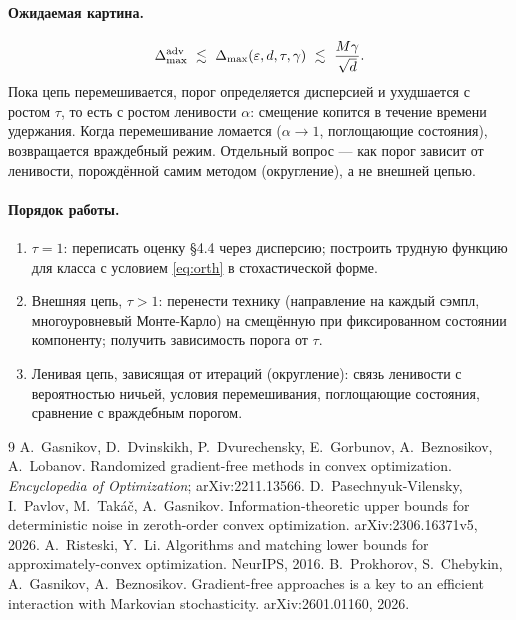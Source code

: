 \documentclass[10pt,a4paper]{article}
\newcommand{\Dmax}{\Delta_{\max}}
\theoremstyle{definition}\newtheorem{definition}{Определение}
\begin{document}
\paragraph{Ожидаемая картина.}
\[
\Dmax^{\rm adv}\ \lesssim\ \Dmax(\varepsilon,d,\tau,\gamma)\ \lesssim\ \frac{M\gamma}{\sqrt d}.
\]
Пока цепь перемешивается, порог определяется дисперсией и ухудшается с ростом $\tau$, то есть с ростом ленивости $\alpha$: смещение копится в течение времени удержания. Когда перемешивание ломается ($\alpha\to1$, поглощающие состояния), возвращается враждебный режим. Отдельный вопрос — как порог зависит от ленивости, порождённой самим методом (округление), а не внешней цепью.

\paragraph{Порядок работы.}
\begin{enumerate}
\item $\tau=1$: переписать оценку §4.4 \cite{survey} через дисперсию; построить трудную функцию для класса с условием \eqref{eq:orth} в стохастической форме.
\item Внешняя цепь, $\tau>1$: перенести технику \cite{prokhorov} (направление на каждый сэмпл, многоуровневый Монте-Карло) на смещённую при фиксированном состоянии компоненту; получить зависимость порога от $\tau$.
\item Ленивая цепь, зависящая от итераций (округление): связь ленивости с вероятностью ничьей, условия перемешивания, поглощающие состояния, сравнение с враждебным порогом.
\end{enumerate}

\begin{thebibliography}{9}\small
{} A.~Gasnikov, D.~Dvinskikh, P.~Dvurechensky, E.~Gorbunov, A.~Beznosikov, A.~Lobanov. Randomized gradient-free methods in convex optimization. \emph{Encyclopedia of Optimization}; arXiv:2211.13566.
 D.~Pasechnyuk-Vilensky, I.~Pavlov, M.~Takáč, A.~Gasnikov. Information-theoretic upper bounds for deterministic noise in zeroth-order convex optimization. arXiv:2306.16371v5, 2026.
 A.~Risteski, Y.~Li. Algorithms and matching lower bounds for approximately-convex optimization. NeurIPS, 2016.
 B.~Prokhorov, S.~Chebykin, A.~Gasnikov, A.~Beznosikov. Gradient-free approaches is a key to an efficient interaction with Markovian stochasticity. arXiv:2601.01160, 2026.
\end{thebibliography}
\end{document}

